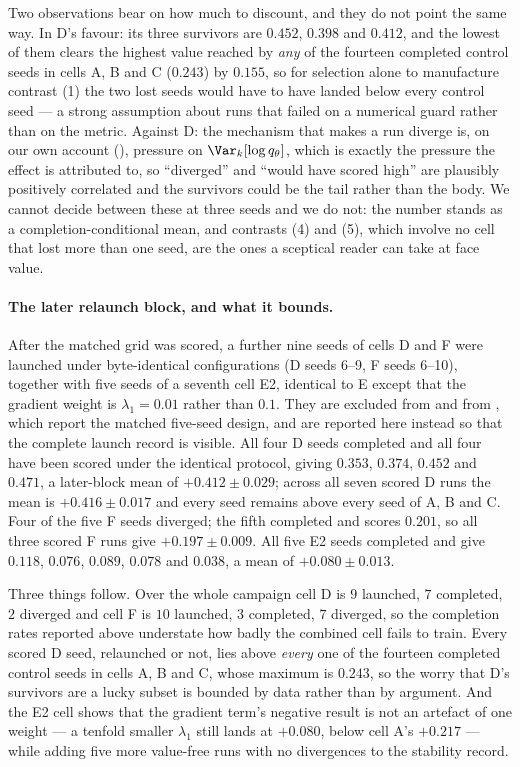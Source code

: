 Two observations bear on how much to discount, and they do not point the same way. In
D's favour: its three survivors are $0.452$, $0.398$ and $0.412$, and the lowest of
them clears the highest value reached by \emph{any} of the fourteen completed control
seeds in cells A, B and C ($0.243$) by $0.155$, so for selection alone to manufacture
contrast (1) the two lost seeds would have to have landed below every control seed ---
a strong assumption about runs that failed on a numerical guard rather than on the
metric. Against D: the mechanism that makes a run diverge is, on our own account
(), pressure on $\Var_k[\log q_\theta]$, which is exactly the
pressure the effect is attributed to, so ``diverged'' and ``would have scored high''
are plausibly positively correlated and the survivors could be the tail rather than the
body. We cannot decide between these at three seeds and we do not: the number stands as
a completion-conditional mean, and contrasts (4) and (5), which involve no cell that
lost more than one seed, are the ones a sceptical reader can take at face value.

\paragraph{The later relaunch block, and what it bounds.} After the matched grid was
scored, a further nine seeds of cells D and F were launched under byte-identical
configurations (D seeds 6--9, F seeds 6--10), together with five seeds of a seventh
cell E2, identical to E except that the gradient weight is $\lambda_1 = 0.01$ rather
than $0.1$. They are excluded from  and from
, which report the matched five-seed design, and are reported here
instead so that the complete launch record is visible. All four D seeds completed and
all four have been scored under the identical protocol, giving $0.353$, $0.374$,
$0.452$ and $0.471$, a later-block mean of $+0.412 \pm 0.029$; across all seven scored
D runs the mean is $+0.416 \pm 0.017$ and every seed remains above every seed of A, B
and C. Four of the five F seeds diverged; the fifth completed and scores $0.201$, so
all three scored F runs give $+0.197 \pm 0.009$. All five E2 seeds completed and give
$0.118$, $0.076$, $0.089$, $0.078$ and $0.038$, a mean of $+0.080 \pm 0.013$.

Three things follow. Over the whole campaign
cell D is $9$ launched, $7$ completed, $2$ diverged and cell F is $10$ launched, $3$
completed, $7$ diverged, so the completion rates reported above understate how badly the
combined cell fails to train. Every scored D seed, relaunched or not, lies above
\emph{every} one of the fourteen completed control seeds in cells A, B and C, whose
maximum is $0.243$, so the worry that D's survivors are a lucky subset is bounded by
data rather than by argument. And the E2 cell shows that the gradient term's negative
result is not an artefact of one weight --- a tenfold smaller $\lambda_1$ still lands at
$+0.080$, below cell A's $+0.217$ --- while adding five more value-free runs with no
divergences to the stability record.

